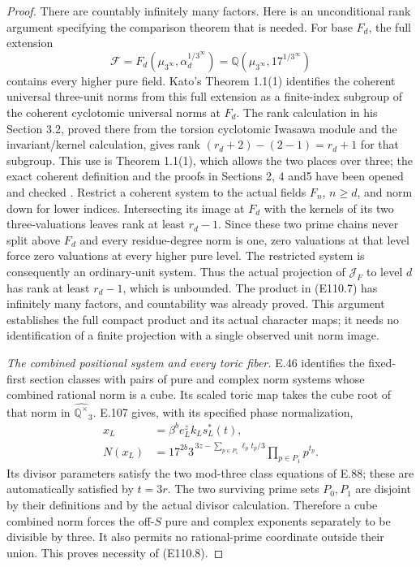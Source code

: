 \begin{proof}
There are countably infinitely many factors. Here is an
unconditional rank argument specifying the comparison theorem
that is needed. For base $F_d$, the full extension
\[
       \mathcal F=F_d(\mu_{3^\infty},
                            \alpha_d^{1/3^\infty})
                =\mathbb Q(\mu_{3^\infty},17^{1/3^\infty})
 \tag{E110.23}
\]
contains every higher pure field. Kato's Theorem 1.1(1) identifies
the coherent universal three-unit norms from this full extension
as a finite-index subgroup of the coherent cyclotomic
universal norms at $F_d$.
The rank calculation in his Section 3.2, proved there from
the torsion cyclotomic Iwasawa module and the invariant/kernel
calculation, gives rank
$(r_d+2)-(2-1)=r_d+1$ for that subgroup.
This use is Theorem 1.1(1), which allows the two places over three;
the exact coherent definition and the proofs in Sections 2,
4 and5 have been opened and checked
\cite[Theorem 1.1(1), Section 3.2, Proposition4.2,
and Sections 5.4--5.5]{E_KatoUniversalNorms}.
Restrict a coherent system to the actual fields $F_n$, $n\ge d$,
and norm down for lower indices.
Intersecting its image at $F_d$ with the kernels of its two
three-valuations leaves rank at least $r_d-1$.
Since these two prime chains never split above $F_d$ and every
residue-degree norm is one, zero valuations at that level force
zero valuations at every higher pure level.
The restricted system is consequently an ordinary-unit system.
Thus the actual projection of $\mathcal J_F$ to level $d$
has rank at least $r_d-1$, which is unbounded.
The product in (E110.7) has infinitely many factors, and
countability was already proved. This argument establishes the
full compact product and its actual character maps; it needs no
identification of a finite projection with a single observed
unit norm image.

\emph{The combined positional system and every toric fiber.}
E.46 identifies the fixed-first section classes with pairs of
pure and complex norm systems whose combined rational norm is
a cube. Its scaled toric map takes the cube root of that norm
in $\widehat{\mathbb Q^\times}_3$.
E.107 gives, with its specified phase normalization,
\[
 \begin{split}
 x_L&=\beta^b e_L^z k_Ls_L^*(t),\\
 N(x_L)&=17^{2b}
          3^{\,3z-\sum_{p\in P_1}\ell_pt_p/3}
                                      \prod_{p\in P_1}p^{t_p}.
 \end{split}
 \tag{E110.24}
\]
Its divisor parameters satisfy the two mod-three class equations
of E.88; these are automatically satisfied by $t=3r$.
The two surviving prime sets $P_0,P_1$ are disjoint by their
definitions and by the actual divisor calculation.
Therefore a cube combined norm forces the off-$S$ pure and
complex exponents separately to be divisible by three.
It also permits no rational-prime coordinate outside their union.
This proves necessity of (E110.8).


\end{proof}
